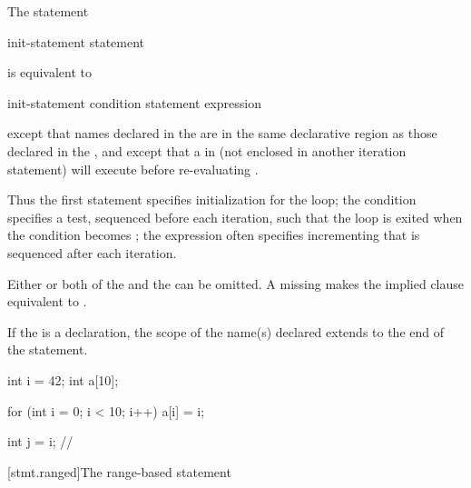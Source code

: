 \pnum
The  statement
\begin{ncsimplebnf}
 \terminal{(} init-statement  \terminal{;}  \terminal{)} statement
\end{ncsimplebnf}
is equivalent to
\begin{ncsimplebnf}
\terminal{\{}\br
\bnfindent init-statement\br
\bnfindent {} \terminal{(} condition \terminal{)} \terminal{\{}\br
\bnfindent\bnfindent statement\br
\bnfindent\bnfindent expression \terminal{;}\br
\bnfindent \terminal{\}}\br
\terminal{\}}
\end{ncsimplebnf}
except that names declared in the  are in
the same declarative region as those declared in the
, and except that a
%
 in  (not enclosed in another
iteration statement) will execute  before
re-evaluating .
\begin{note}
Thus the first statement specifies initialization for the loop; the
condition specifies a test, sequenced before each
iteration, such that the loop is exited when the condition becomes
; the expression often specifies incrementing that is
sequenced after each iteration.
\end{note}

\pnum
Either or both of the 
and the  can be omitted.
A missing 
makes the implied  clause
equivalent to .

\pnum
{}%
%
If the  is a declaration, the scope of the
name(s) declared extends to the end of the  statement.
\begin{example}

\begin{codeblock}
int i = 42;
int a[10];

for (int i = 0; i < 10; i++)
  a[i] = i;

int j = i;          // 
\end{codeblock}
\end{example}

[stmt.ranged]{The range-based  statement}%

